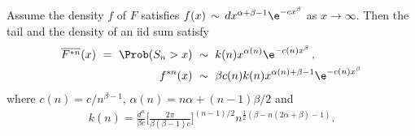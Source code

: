 \begin{corollary} \label{SACor4.2}
Assume the density $f$ of $F$ satisfies $f(x)\,\sim\, dx^{\alpha+\beta-1}\e^{-c x^\beta}$ as $x\to\infty$. Then the tail and the density of an iid sum satisfy
\begin{align}\label{SA4.2c}
\overline{F^{*n}}(x)\ =\ \Prob(S_n>x)\ &\sim \ k(n) x^{\alpha(n)}\e^{-c(n) x^\beta}\,,
\\ \label{SA4.2d}  f^{*n}(x)\ &\sim\ \beta c(n) k(n) x^{\alpha(n)+\beta-1}\e^{-c(n) x^\beta}
\end{align}
where $c(n)=c/n^{\beta-1}$, $\alpha(n) = n\alpha+(n-1)\beta/2$ and
\begin{align}\label{SA4.2g}
k(n) = \frac{d^n}{\beta c} \Big[ \frac{2\pi}{\beta(\beta-1) c} \Big]^{(n-1)/2} n^{\frac{1}{2} (\beta -n (2 \alpha +\beta )-1)}.
\end{align}
\end{corollary}
